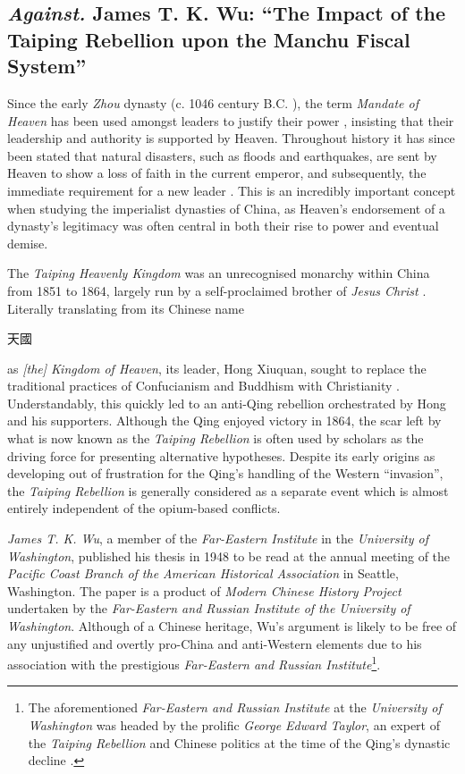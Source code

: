 \documentclass{article}
\newcommand{\zht}[1]{%
        \begin{CJK}{UTF8}{bsmi}%
                \normalfont%
                #1
        \end{CJK}
}
\begin{document}
        

\subsection{\emph{Against.} James T. K. Wu: ``The Impact of the Taiping Rebellion upon the Manchu Fiscal System''}

        Since the early \textit{Zhou} dynasty (c. 1046 century B.C. \autocite{Loewe:1999}), the term \textit{Mandate of Heaven} has been used amongst leaders to justify their power \autocite{Zhao:2009}, insisting that their leadership and authority is supported by Heaven. Throughout history it has since been stated that natural disasters, such as floods and earthquakes, are sent by Heaven to show a loss of faith in the current emperor, and subsequently, the immediate requirement for a new leader \autocite{Elvin:1998}. This is an incredibly important concept when studying the imperialist dynasties of China, as Heaven's endorsement of a dynasty's legitimacy was often central in both their rise to power and eventual demise.

        The \textit{Taiping Heavenly Kingdom} was an unrecognised monarchy within China from 1851 to 1864, largely run by a self-proclaimed brother of \textit{Jesus Christ} \autocites{Reilly:2014}{Yap:1954}. Literally translating from its Chinese name \zht{天國} as \textit{[the] Kingdom of Heaven}, its leader, Hong Xiuquan, sought to replace the traditional practices of Confucianism and Buddhism with Christianity \autocite{Spence:1996}. Understandably, this quickly led to an anti-Qing rebellion orchestrated by Hong and his supporters. Although the Qing enjoyed victory in 1864, the scar left by what is now known as the \textit{Taiping Rebellion} is often used by scholars as the driving force for presenting alternative hypotheses. Despite its early origins as developing out of frustration for the Qing's handling of the Western ``invasion'', the \textit{Taiping Rebellion} is generally considered as a separate event which is almost entirely independent of the opium-based conflicts.

        

        \textit{James T. K. Wu}, a member of the \textit{Far-Eastern Institute} in the \textit{University of Washington}, published his thesis in 1948 to be read at the annual meeting of the \textit{Pacific Coast Branch of the American Historical Association} in Seattle, Washington. The paper is a product of \textit{Modern Chinese History Project} undertaken by the \textit{Far-Eastern and Russian Institute of the University of Washington}. Although of a Chinese heritage, Wu's argument is likely to be free of any unjustified and overtly pro-China and anti-Western elements due to his association with the prestigious \textit{Far-Eastern and Russian Institute}\footnote{The aforementioned \textit{Far-Eastern and Russian Institute} at the \textit{University of Washington} was headed by the prolific \textit{George Edward Taylor}, an expert of the \textit{Taiping Rebellion} and Chinese politics at the time of the Qing's dynastic decline \autocite{Taylor:1999}.}.
\end{document}
